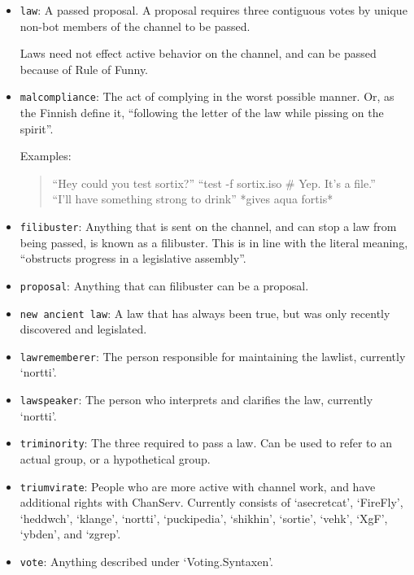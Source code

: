 \documentclass[11pt]{article}
\begin{document}
\begin{itemize}
\item \texttt{law}: A passed proposal. A proposal requires three contiguous votes
by unique non-bot members of the channel to be passed.

Laws need not effect active behavior on the channel, and can be passed because of
Rule of Funny.

\item \texttt{malcompliance}: The act of complying in the worst possible manner. Or,
as the Finnish define it, ``following the letter of the law while pissing on the spirit''.

Examples:
\begin{quote}
``Hey could you test sortix?'' ``test -f sortix.iso \# Yep. It's a file.'' \\
``I'll have something strong to drink'' *gives aqua fortis*
\end{quote}

\item \texttt{filibuster}: Anything that is sent on the channel, and can stop a
law from being passed, is known as a filibuster. This is in line with the literal meaning,
``obstructs progress in a legislative assembly''.

\item \texttt{proposal}: Anything that can filibuster can be a proposal.

\item \texttt{new ancient law}: A law that has always been true, 
but was only recently discovered and legislated.

\item \texttt{lawrememberer}: The person responsible for maintaining the lawlist,
currently `nortti'.

\item \texttt{lawspeaker}: The person who interprets and clarifies the law,
currently `nortti'.

\item \texttt{triminority}: The three required to pass a law. Can be used to refer to
an actual group, or a hypothetical group.

\item \texttt{triumvirate}: People who are more active with channel work, and have
additional rights with ChanServ. Currently consists of `asecretcat', `FireFly', `heddwch',
`klange', `nortti', `puckipedia', `shikhin', `sortie', `vehk', `XgF', `ybden', and `zgrep'.

\item \texttt{vote}: Anything described under `Voting.Syntaxen'.
\end{itemize}
\end{document}

